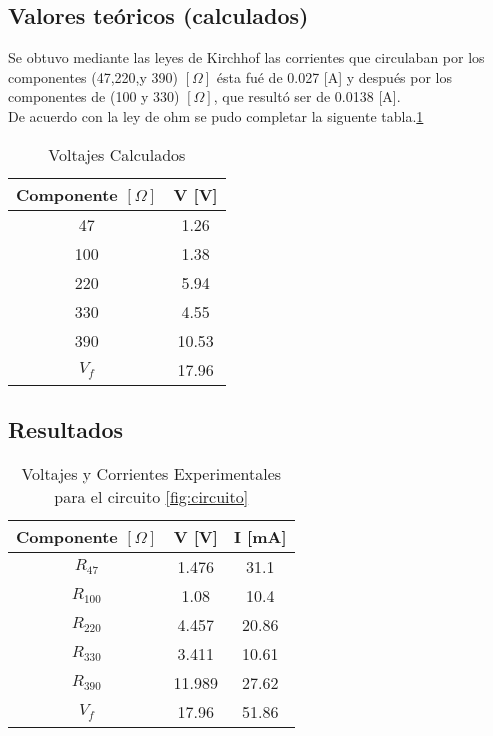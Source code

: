 \documentclass{article}
\begin{document}
\subsection{Valores teóricos (calculados)}

Se obtuvo mediante las leyes de Kirchhof las corrientes que circulaban por los componentes (47,220,y 390) $[\Omega]$ ésta fué de 0.027 [A] y después por los componentes de (100 y 330) $[\Omega]$, que resultó ser de 0.0138 [A].\\

De acuerdo con la ley de ohm se pudo completar la siguente tabla.\ref{tabla-teoricos}
\\

\begin{table}[h!]
\centering

\begin{tabular}{|c|c|}
\hline
Componente $[\Omega]$& V {[}V{]} \\ \hline
47         &   1.26       \\ \hline
100        & 1.38           \\ \hline
220        & 5.94          \\ \hline
330        &     4.55      \\ \hline
390        &         10.53  \\ \hline
$V_f$        &         17.96  \\ \hline
\end{tabular}

\caption{Voltajes Calculados}
\label{tabla-teoricos}
\end{table}

\subsection{Resultados}


\begin{table}[h!]
\centering

\begin{tabular}{|c|c|c|}
\hline
Componente $[\Omega]$ & V [V] & I [mA] \\ \hline
$R_{47}$        &   1.476 & 31.1\\ \hline
$R_{100}$         & 1.08 & 10.4 \\ \hline
$R_{220}$       & 4.457 & 20.86 \\ \hline
$R_{330}$        & 3.411 & 10.61 \\ \hline
$R_{390}$        & 11.989 & 27.62 \\ \hline
$V_f$        &    17.96 & 51.86 \\ \hline
\end{tabular}

\caption{Voltajes y Corrientes Experimentales para el circuito \ref{fig:circuito}}
\label{tabla-experimentales}
\end{table}
\end{document}

